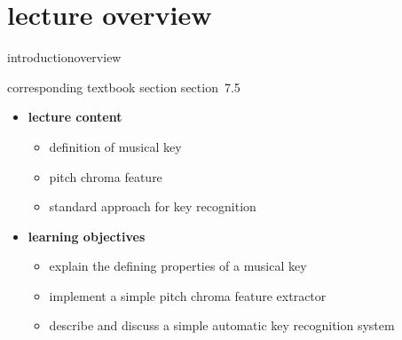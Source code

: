 


\subtitle{module 7.5: musical key recognition}


	

    \section[overview]{lecture overview}
        \begin{frame}{introduction}{overview}
            \begin{block}{corresponding textbook section}
                    section~7.5
            \end{block}

            \begin{itemize}
                \item   \textbf{lecture content}
                    \begin{itemize}
                        \item   definition of musical key
                        \item   pitch chroma feature
                        \item   standard approach for key recognition
                    \end{itemize}
                \bigskip
                \item<2->   \textbf{learning objectives}
                    \begin{itemize}
                        \item   explain the defining properties of a musical key
                        \item   implement a simple pitch chroma feature extractor
                        \item   describe and  discuss a simple automatic key recognition system
                    \end{itemize}
            \end{itemize}
        \end{frame}

